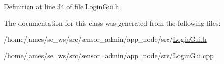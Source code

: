 Definition at line 34 of file Login\-Gui.\-h.



The documentation for this class was generated from the following files\-:\begin{DoxyCompactItemize}
\item 
/home/james/se\-\_\-ws/src/sensor\-\_\-admin/app\-\_\-node/src/\hyperlink{app__node_2src_2_login_gui_8h}{Login\-Gui.\-h}\item 
/home/james/se\-\_\-ws/src/sensor\-\_\-admin/app\-\_\-node/src/\hyperlink{app__node_2src_2_login_gui_8cpp}{Login\-Gui.\-cpp}\end{DoxyCompactItemize}
